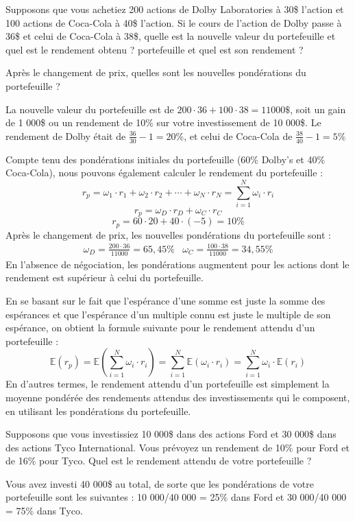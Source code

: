\documentclass[a4paper, 12pt]{report}
\begin{document}
Supposons que vous achetiez 200 actions de Dolby Laboratories à 30\$ l'action et 100 actions de Coca-Cola à 40\$ l'action. Si le cours de l'action de Dolby passe à 36\$ et celui de Coca-Cola à 38\$, quelle est la nouvelle valeur du portefeuille et quel est le rendement obtenu ? portefeuille et quel est son rendement ?

Après le changement de prix, quelles sont les nouvelles pondérations du portefeuille ?

La nouvelle valeur du portefeuille est de $200 \cdot 36 + 100 \cdot 38  = 11 000\$ $, soit un gain de 1 000\$ ou un rendement de 10\% sur votre investissement de 10 000\$. Le rendement de Dolby était de $\frac{36}{30}-1=20\%$, et celui de Coca-Cola de $\frac{38}{40}-1=5\%$

Compte tenu des pondérations initiales du portefeuille (60\% Dolby's et 40\% Coca-Cola), nous pouvons également calculer le rendement du portefeuille :
$$
r_p=\omega_1\cdot r_1+\omega_2\cdot r_2+\cdots+\omega_N\cdot r_N=\sum_{i=1}^{N}\omega_i\cdot r_i
$$
$$
r_p=\omega_D\cdot r_D+\omega_C\cdot r_C
$$
$$
r_p=60\cdot 20+40\cdot (-5)=10\%
$$
Après le changement de prix, les nouvelles pondérations du portefeuille sont :
$$
\begin{matrix}
	\omega_D=\frac{200\cdot36}{11000}=65,45\% & \omega_C=\frac{100\cdot38}{11000}=34,55\% 
\end{matrix}
$$
En l'absence de négociation, les pondérations augmentent pour les actions dont le rendement est supérieur à celui du portefeuille.

En se basant sur le fait que l'espérance d'une somme est juste la somme des espérances et que l'espérance d'un multiple connu est juste le multiple de son espérance, on obtient la formule suivante pour le rendement attendu d'un portefeuille :
$$
\mathbb{E}(r_p)=\mathbb{E}\left( \sum_{i=1}^{N} \omega_i \cdot r_i \right)=\sum_{i=1}^{N}\mathbb{E}(\omega_i \cdot r_i)=\sum_{i=1}^{N}\omega_i \cdot \mathbb{E}(r_i) 
$$
En d'autres termes, le rendement attendu d'un portefeuille est simplement la moyenne pondérée des rendements attendus des investissements qui le composent, en utilisant les pondérations du portefeuille.

Supposons que vous investissiez 10 000\$ dans des actions Ford et 30 000\$ dans des actions Tyco International. Vous prévoyez un rendement de 10\% pour Ford et de 16\% pour Tyco. Quel est le rendement attendu de votre portefeuille ?

Vous avez investi 40 000\$ au total, de sorte que les pondérations de votre portefeuille sont les suivantes : 10 000/40 000 = 25\% dans Ford et 30 000/40 000 = 75\% dans Tyco.
\end{document}
